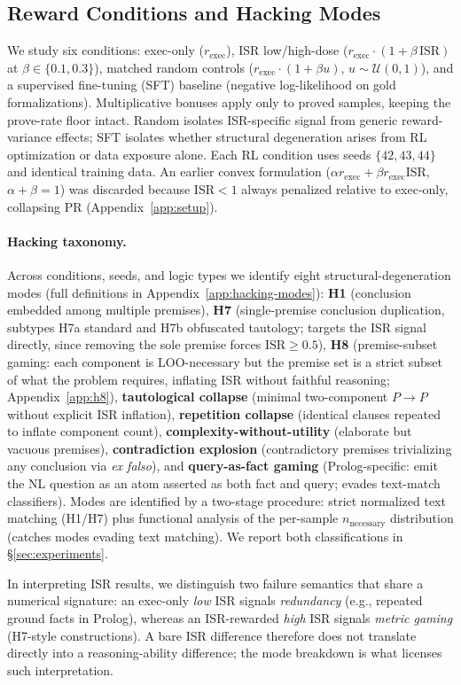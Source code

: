 \subsection{Reward Conditions and Hacking Modes}
\label{sec:rewards}
\label{sec:taxonomy-method}

We study six conditions: exec-only ($r_{\text{exec}}$), ISR low/high-dose ($r_{\text{exec}}\cdot(1{+}\beta\,\text{ISR})$ at $\beta\in\{0.1,0.3\}$), matched random controls ($r_{\text{exec}}\cdot(1{+}\beta u)$, $u\sim\mathcal{U}(0,1)$), and a supervised fine-tuning (SFT) baseline (negative log-likelihood on gold formalizations).
Multiplicative bonuses apply only to proved samples, keeping the prove-rate floor intact.
Random isolates ISR-specific signal from generic reward-variance effects; SFT isolates whether structural degeneration arises from RL optimization or data exposure alone.
Each RL condition uses seeds $\{42,43,44\}$ and identical training data.
An earlier convex formulation ($\alpha r_{\text{exec}} + \beta r_{\text{exec}}\text{ISR}$, $\alpha{+}\beta{=}1$) was discarded because $\text{ISR}{<}1$ always penalized relative to exec-only, collapsing PR (Appendix~\ref{app:setup}).

\paragraph{Hacking taxonomy.}
Across conditions, seeds, and logic types we identify eight structural-degeneration modes (full definitions in Appendix~\ref{app:hacking-modes}):
\textbf{H1} (conclusion embedded among multiple premises),
\textbf{H7} (single-premise conclusion duplication, subtypes H7a standard and H7b obfuscated tautology; targets the ISR signal directly, since removing the sole premise forces $\text{ISR}\geq 0.5$),
\textbf{H8} (premise-subset gaming: each component is LOO-necessary but the premise set is a strict subset of what the problem requires, inflating ISR without faithful reasoning; Appendix~\ref{app:h8}),
\textbf{tautological collapse} (minimal two-component $P{\to}P$ without explicit ISR inflation),
\textbf{repetition collapse} (identical clauses repeated to inflate component count),
\textbf{complexity-without-utility} (elaborate but vacuous premises),
\textbf{contradiction explosion} (contradictory premises trivializing any conclusion via \emph{ex falso}), and
\textbf{query-as-fact gaming} (Prolog-specific: emit the NL question as an atom asserted as both fact and query; evades text-match classifiers).
Modes are identified by a two-stage procedure: strict normalized text matching (H1/H7) plus functional analysis of the per-sample $n_{\text{necessary}}$ distribution (catches modes evading text matching).
We report both classifications in \S\ref{sec:experiments}.

In interpreting ISR results, we distinguish two failure semantics that share a numerical signature: an exec-only \emph{low} ISR signals \emph{redundancy} (e.g., repeated ground facts in Prolog), whereas an ISR-rewarded \emph{high} ISR signals \emph{metric gaming} (H7-style constructions).
A bare ISR difference therefore does not translate directly into a reasoning-ability difference; the mode breakdown is what licenses such interpretation.
